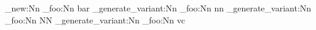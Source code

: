 \cs_new:Nn
  \module_foo:Nn
  { bar }
\cs_generate_variant:Nn
  \module_foo:Nn
  { nn }  %
\cs_generate_variant:Nn
  \module_foo:Nn
  { NN }  %
\cs_generate_variant:Nn
  \module_foo:Nn
  { vc }  %
